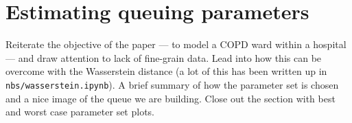 \section{Estimating queuing parameters}\label{sec:wasserstein}

Reiterate the objective of the paper --- to model a COPD ward within a hospital
--- and draw attention to lack of fine-grain data. Lead into how this can be
overcome with the Wasserstein distance (a lot of this has been written up in
\texttt{nbs/wasserstein.ipynb}). A brief summary of how the parameter set is
chosen and a nice image of the queue we are building. Close out the section with
best and worst case parameter set plots.
